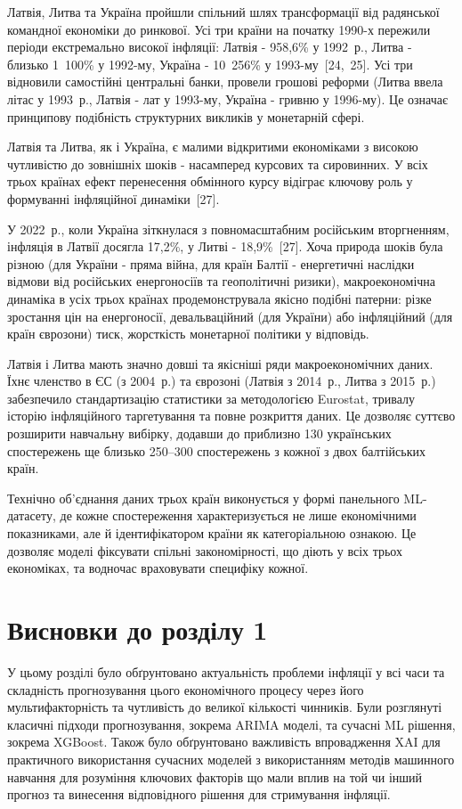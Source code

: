 \documentclass[a4paper,ukrainian,oneside]{extreport}
\newcommand{\chapconclude}[1]{\section*{Висновки до розділу #1}\addcontentsline{toc}{section}{Висновки до розділу #1}}
\begin{document}
Латвія, Литва та Україна пройшли спільний шлях трансформації від радянської командної економіки до ринкової. Усі три країни на початку 1990-х пережили періоди екстремально високої інфляції: Латвія - 958,6\% у 1992~р., Литва - близько 1~100\% у 1992-му, Україна - 10~256\% у 1993-му~[24,~25]. Усі три відновили самостійні центральні банки, провели грошові реформи (Литва ввела літас у 1993~р., Латвія - лат у 1993-му, Україна - гривню у 1996-му). Це означає принципову подібність структурних викликів у монетарній сфері.

Латвія та Литва, як і Україна, є малими відкритими економіками з високою чутливістю до зовнішніх шоків - насамперед курсових та сировинних. У всіх трьох країнах ефект перенесення обмінного курсу відіграє ключову роль у формуванні інфляційної динаміки~[27].

У 2022~р., коли Україна зіткнулася з повномасштабним російським вторгненням, інфляція в Латвії досягла 17,2\%, у Литві - 18,9\%~[27]. Хоча природа шоків була різною (для України - пряма війна, для країн Балтії - енергетичні наслідки відмови від російських енергоносіїв та геополітичні ризики), макроекономічна динаміка в усіх трьох країнах продемонструвала якісно подібні патерни: різке зростання цін на енергоносії, девальваційний (для України) або інфляційний (для країн єврозони) тиск, жорсткість монетарної політики у відповідь.

Латвія і Литва мають значно довші та якісніші ряди макроекономічних даних. Їхнє членство в ЄС (з 2004~р.) та єврозоні (Латвія з 2014~р., Литва з 2015~р.) забезпечило стандартизацію статистики за методологією Eurostat, тривалу історію інфляційного таргетування та повне розкриття даних. Це дозволяє суттєво розширити навчальну вибірку, додавши до приблизно 130 українських спостережень ще близько 250--300 спостережень з кожної з двох балтійських країн.

Технічно об'єднання даних трьох країн виконується у формі панельного ML-датасету, де кожне спостереження характеризується не лише економічними показниками, але й ідентифікатором країни як категоріальною ознакою. Це дозволяє моделі фіксувати спільні закономірності, що діють у всіх трьох економіках, та водночас враховувати специфіку кожної.

\chapconclude{1}

У цьому розділі було обґрунтовано актуальність проблеми інфляції у всі часи та складність прогнозування цього економічного процесу через його мультифакторність та чутливість до великої кількості чинників. Були розглянуті класичні підходи прогнозування, зокрема ARIMA моделі, та сучасні ML рішення, зокрема XGBoost. Також було обґрунтовано важливість впровадження XAI для практичного використання сучасних моделей з використанням методів машинного навчання для розуміння ключових факторів що мали вплив на той чи інший прогноз та винесення відповідного рішення для стримування інфляції.
\end{document}
